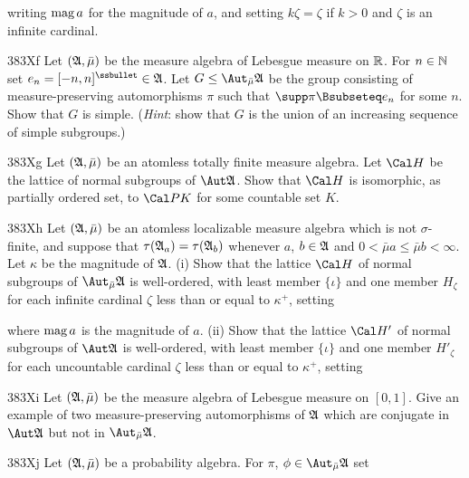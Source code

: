 {\noindent writing $\mathop{\text{mag}} a$ for the magnitude of $a$, and setting
$k\zeta=\zeta$ if $k>0$ and $\zeta$ is an infinite cardinal.

\sqheader 383Xf Let $(\frak A,\bar\mu)$ be the measure algebra of
Lebesgue measure on $\Bbb R$.   For $n\in\Bbb N$ set
$e_n=[-n,n]^{\ssbullet}\in\frak A$.   Let $G\le\AmuA$ be the group
consisting of measure-preserving automorphisms $\pi$ such that
$\supp\pi\Bsubseteq e_n$ for some $n$.   Show that $G$ is simple.
({\it Hint\/}:  show that $G$ is the union of an increasing sequence of
simple subgroups.)

\spheader 383Xg Let $(\frak A,\bar\mu)$ be an atomless totally finite
measure algebra.   Let $\Cal H$ be the lattice of normal subgroups of
$\Aut\frak A$.   Show that $\Cal H$ is isomorphic, as partially ordered
set, to $\Cal PK$ for some countable set $K$.

\spheader 383Xh Let $(\frak A,\bar\mu)$ be an atomless localizable
measure algebra which is not $\sigma$-finite, and suppose that
$\tau(\frak A_a)=\tau(\frak A_b)$ whenever $a$, $b\in\frak A$ and
$0<\bar\mu a\le\bar\mu b<\infty$.   Let $\kappa$ be the magnitude of
$\frak A$.   (i) Show that the lattice $\Cal H$ of normal subgroups of
$\AmuA$ is well-ordered, with least member $\{\iota\}$ and one
member $H_{\zeta}$ for each infinite cardinal $\zeta$ less than or equal
to $\kappa^+$, setting


\noindent where $\mathop{\text{mag}} a$ is the magnitude of $a$.   (ii) Show that
the lattice $\Cal H'$ of normal subgroups of $\Aut\frak A$ is
well-ordered, with least member $\{\iota\}$ and one member $H'_{\zeta}$
for each uncountable cardinal $\zeta$ less than or equal to $\kappa^+$,
setting


\spheader 383Xi Let $(\frak A,\bar\mu)$ be the measure algebra of
Lebesgue measure on $[0,1]$.   Give an example of two measure-preserving
automorphisms of $\frak A$ which are conjugate in $\Aut\frak A$ but not
in $\AmuA$.

\spheader 383Xj Let $(\frak A,\bar\mu)$ be a probability algebra.   For
$\pi$, $\phi\in\AmuA$ set


}
